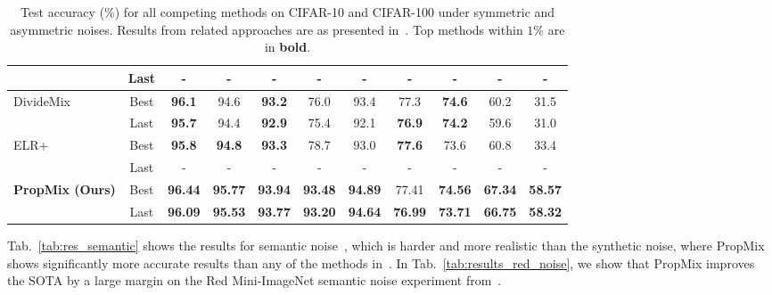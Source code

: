 \documentclass{bmvc2k}
\begin{document}
\begin{table*}[t!]
{\begin{tabular}{lc|cccc|c||cccc}
  & Last & - & - & - & - & - &  - & - & - & - \\
\hline
\multirow{2}{*}{DivideMix \citep{DivideMix}}& Best & \textbf{96.1} & 94.6 & \textbf{93.2} & 76.0& 93.4  & 77.3 & \textbf{74.6} & 60.2 & 31.5 \\
  & Last & \textbf{95.7} & 94.4 & \textbf{92.9} & 75.4& 92.1  & \textbf{76.9} & \textbf{74.2} & 59.6 & 31.0 \\
\hline
\multirow{2}{*}{ELR+~\citep{liu2020early}}& Best & \textbf{95.8} & \textbf{94.8} & \textbf{93.3} & 78.7& 93.0 &  \textbf{77.6} & 73.6 & 60.8 & 33.4 \\
  & Last & - & - & - & - & - &  - & - & - & - \\
\hline



\multirow{2}{*}{\textbf{PropMix (Ours)}}& Best & \textbf{96.44} & \textbf{95.77} & \textbf{93.94} & \textbf{93.48} & \textbf{94.89} &  77.41 & \textbf{74.56} & \textbf{67.34} & \textbf{58.57}\\
    & Last & \textbf{96.09} & \textbf{95.53} & \textbf{93.77} & \textbf{93.20} & \textbf{94.64} &  \textbf{76.99} & \textbf{73.71} & \textbf{66.75} & \textbf{58.32}\\
\hline
\end{tabular}
}
\caption{Test accuracy (\%) for all competing methods on CIFAR-10 and CIFAR-100 under symmetric and asymmetric noises. Results from related approaches are as presented in~\citep{DivideMix}. 
Top methods within $1\%$ are in \textbf{bold}.} 
\label{tab:results_cifar}
\end{table*}

Tab.~\ref{tab:res_semantic} shows the results for semantic noise~\citep{rog}, which is harder and more realistic than the synthetic noise, where PropMix shows significantly more accurate results than any of the methods in~\citep{rog}. 
In Tab.~\ref{tab:results_red_noise}, we show that PropMix improves the SOTA by a large margin on the Red Mini-ImageNet semantic noise experiment from~\citep{jiang2020beyond}.
\end{document}
